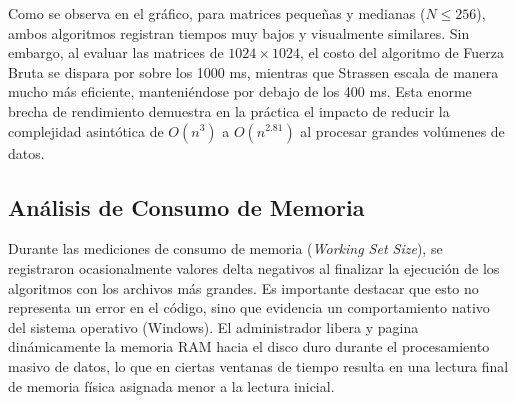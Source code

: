 Como se observa en el gráfico, para matrices pequeñas y medianas ($N \le 256$), ambos algoritmos registran tiempos muy bajos y visualmente similares. Sin embargo, al evaluar las matrices de $1024 \times 1024$, el costo del algoritmo de Fuerza Bruta se dispara por sobre los 1000 ms, mientras que Strassen escala de manera mucho más eficiente, manteniéndose por debajo de los 400 ms. Esta enorme brecha de rendimiento demuestra en la práctica el impacto de reducir la complejidad asintótica de $O(n^3)$ a $O(n^{2.81})$ al procesar grandes volúmenes de datos.

\subsection{Análisis de Consumo de Memoria}
Durante las mediciones de consumo de memoria (\textit{Working Set Size}), se registraron ocasionalmente valores delta negativos al finalizar la ejecución de los algoritmos con los archivos más grandes. Es importante destacar que esto no representa un error en el código, sino que evidencia un comportamiento nativo del sistema operativo (Windows). El administrador libera y pagina dinámicamente la memoria RAM hacia el disco duro durante el procesamiento masivo de datos, lo que en ciertas ventanas de tiempo resulta en una lectura final de memoria física asignada menor a la lectura inicial.